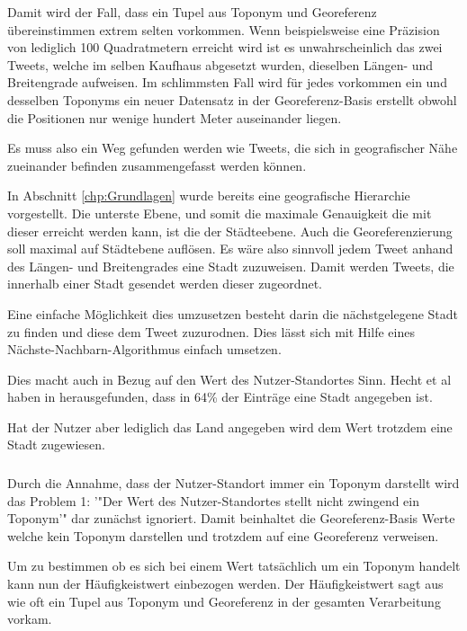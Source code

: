 						Damit wird der Fall, dass ein Tupel aus Toponym und Georeferenz übereinstimmen extrem selten vorkommen.
						Wenn beispielsweise eine Präzision von lediglich 100 Quadratmetern erreicht wird ist es unwahrscheinlich das zwei Tweets, welche im selben Kaufhaus abgesetzt wurden, dieselben Längen- und Breitengrade aufweisen.
						Im schlimmsten Fall wird für jedes vorkommen ein und desselben Toponyms ein neuer Datensatz in der Georeferenz-Basis erstellt obwohl die Positionen nur wenige hundert Meter auseinander liegen.

						Es muss also ein Weg gefunden werden wie Tweets, die sich in geografischer Nähe zueinander befinden zusammengefasst werden können.

						In Abschnitt \ref{chp:Grundlagen} wurde bereits eine geografische Hierarchie vorgestellt.
						Die unterste Ebene, und somit die maximale Genauigkeit die mit dieser erreicht werden kann, ist die der Städteebene.
						Auch die Georeferenzierung soll maximal auf Städtebene auflösen.
						Es wäre also sinnvoll jedem Tweet anhand des Längen- und Breitengrades eine Stadt zuzuweisen.
						Damit werden Tweets, die innerhalb einer Stadt gesendet werden dieser zugeordnet.
						
						Eine einfache Möglichkeit dies umzusetzen besteht darin die nächstgelegene Stadt zu finden und diese dem Tweet zuzurodnen.
						Dies lässt sich mit Hilfe eines Nächste-Nachbarn-Algorithmus einfach umsetzen.

						Dies macht auch in Bezug auf den Wert des Nutzer-Standortes Sinn. 
						Hecht et al haben in \cite{Hecht2011} herausgefunden, dass in 64\% der Einträge eine Stadt angegeben ist.  
						
						Hat der Nutzer aber lediglich das Land angegeben wird dem Wert trotzdem eine Stadt zugewiesen. 

					\subsubsection{}

						Durch die Annahme, dass der Nutzer-Standort immer ein Toponym darstellt wird das Problem 1: '"Der Wert des Nutzer-Standortes stellt nicht zwingend ein Toponym'" dar zunächst ignoriert.
						Damit beinhaltet die Georeferenz-Basis Werte welche kein Toponym darstellen und trotzdem auf eine Georeferenz verweisen. 

						Um zu bestimmen ob es sich bei einem Wert tatsächlich um ein Toponym handelt kann nun der Häufigkeistwert einbezogen werden.
						Der Häufigkeistwert sagt aus wie oft ein Tupel aus Toponym und Georeferenz in der gesamten Verarbeitung vorkam.

